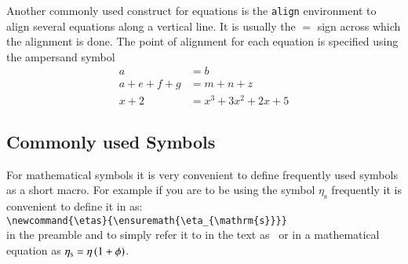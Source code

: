 Another commonly used construct for equations is the \verb|align|
environment to align several equations along a vertical line. It is
usually the $=$ sign across which the alignment is done.  The
point of alignment for each equation is specified using the ampersand symbol 
\begin{align}
a &= b  \\
a + e + f + g & = m + n + z \\
x + 2 & = x^{3} + 3 x^{2} + 2 x + 5
\end{align}

\subsection{Commonly used Symbols}
For mathematical symbols it is very convenient to define frequently
used symbols as a short macro. For example if you are to be using the
symbol $\eta_{\mathrm{s}}$ frequently it is convenient to define it in
as:\\
\verb|\newcommand{\etas}{\ensuremath{\eta_{\mathrm{s}}}}| \\
in the preamble and to simply refer it to in the text as \etas\ or in
a mathematical equation as $\etas = \eta \, ( 1 + \phi)$.

